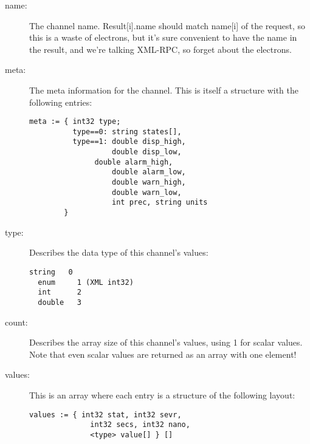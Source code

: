 \begin{description}
\item[\sffamily name:]
   The channel name.
   Result[i].name should match name[i] of the request,
   so this is a waste of electrons, but it's sure convenient
   to have the name in the result, and we're talking XML-RPC,
   so forget about the electrons.
\item[\sffamily meta:]
   The meta information for the channel. This is itself a structure 
   with the following entries:
   \begin{lstlisting}[keywordstyle=\sffamily]
meta := { int32 type;
          type==0: string states[],
          type==1: double disp_high,
                   double disp_low,
	           double alarm_high,
                   double alarm_low,
                   double warn_high,
                   double warn_low,
                   int prec, string units
        }
   \end{lstlisting}
\item[\sffamily type:]
   Describes the data type of this channel's values:
  \begin{lstlisting}[frame=none,keywordstyle=\sffamily]
  string   0
  enum	   1 (XML int32)
  int      2
  double   3
  \end{lstlisting}
\item[\sffamily count:]
  Describes the array size of this channel's values, using 1 for
  scalar values. Note that even scalar values are returned as an array
  with one element!
\item[\sffamily values:]
  This is an array where each entry is a structure of the following
  layout:
  \begin{lstlisting}[frame=none,keywordstyle=\sffamily]
  values := { int32 stat, int32 sevr,
              int32 secs, int32 nano,
              <type> value[] } []
  \end{lstlisting}
\end{description}
